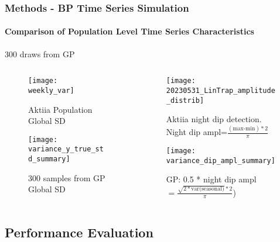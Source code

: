 \documentclass[
	8pt, %
]{beamer}
\begin{document}
\begin{frame}
	\frametitle{Methods - BP Time Series Simulation}
	\framesubtitle{Comparison of Population Level Time Series Characteristics}
	300 draws from GP

			\begin{columns}[c] %
		\begin{column}{0.45\textwidth} %
				\begin{figure}
					\texttt{[image: weekly\_var]}
					\caption{Aktiia Population Global SD}

				\end{figure}

			\begin{figure}
					\texttt{[image: variance\_y\_true\_std\_summary]}
					\caption{300 samples from GP Global SD}
			\end{figure}
		\end{column}
		\begin{column}{0.5\textwidth} %
				\begin{figure}
					\texttt{[image: 20230531\_LinTrap\_amplitude\_distrib]}
					\caption{Aktiia night dip detection. Night dip ampl=$\frac{(\text{max-min})*2}{\pi}$}
				\end{figure}

			\begin{figure}
					\texttt{[image: variance\_dip\_ampl\_summary]}
					\caption{GP: 0.5 * night dip ampl $=\frac{\sqrt {2* \text{var(seasonal)}} * 2}{\pi}$)}
			\end{figure}


		\end{column}
	\end{columns}

\end{frame}


\subsection{Performance Evaluation}
\end{document}
